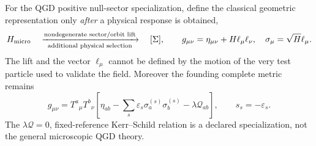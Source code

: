 \documentclass[11pt,a4paper]{article}
\begin{document}
For the QGD positive null-sector specialization, define the classical geometric representation only \emph{after} a physical response is obtained,
\begin{equation}\label{eq:v09-lift}
H_{\rm micro}\quad\xrightarrow[\text{additional physical selection}]{\text{nondegenerate sector/orbit lift}}\quad
[\Sigma],\qquad g_{\mu\nu}=\eta_{\mu\nu}+H\ell_\mu\ell_\nu,\quad \sigma_\mu=\sqrt{H}\ell_\mu.
\end{equation}
The lift and the vector $\ell_\mu$ cannot be defined by the motion of the very test particle used to validate the field. Moreover the founding complete metric remains
\begin{equation}\label{eq:v09-full-metric}
\boxed{g_{\mu\nu}=T^a{}_{\mu}T^b{}_{\nu}\left[\eta_{ab}-\sum_s\varepsilon_s\sigma_a^{(s)}\sigma_b^{(s)}-\lambda\mathcal Q_{ab}\right],\qquad s_s=-\varepsilon_s.}
\end{equation}
The $\lambda\mathcal Q=0$, fixed-reference Kerr--Schild relation is a declared specialization, not the general microscopic QGD theory.
\end{document}
